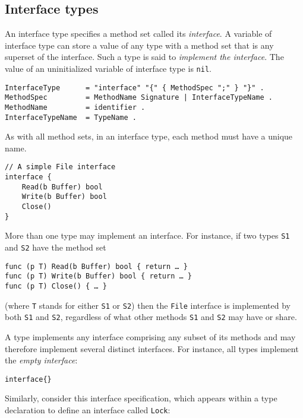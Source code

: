\subsection*{Interface types}

An interface type specifies a method set called
its \emph{interface}. A variable of interface type can store a value of
any type with a method set that is any superset of the interface. Such a
type is said to \emph{implement the interface}. The value of an
uninitialized variable of interface type is \texttt{nil}.

\begin{Verbatim}[frame=single]
InterfaceType      = "interface" "{" { MethodSpec ";" } "}" .
MethodSpec         = MethodName Signature | InterfaceTypeName .
MethodName         = identifier .
InterfaceTypeName  = TypeName .
\end{Verbatim}

As with all method sets, in an interface type, each method must have a
unique name.

\begin{Verbatim}[frame=single]
// A simple File interface
interface {
    Read(b Buffer) bool
    Write(b Buffer) bool
    Close()
}
\end{Verbatim}

More than one type may implement an interface. For instance, if two
types \texttt{S1} and \texttt{S2} have the method set

\begin{Verbatim}[frame=single]
func (p T) Read(b Buffer) bool { return … }
func (p T) Write(b Buffer) bool { return … }
func (p T) Close() { … }
\end{Verbatim}

(where \texttt{T} stands for either \texttt{S1} or \texttt{S2}) then the
\texttt{File} interface is implemented by both \texttt{S1} and
\texttt{S2}, regardless of what other methods \texttt{S1} and
\texttt{S2} may have or share.

A type implements any interface comprising any subset of its methods and
may therefore implement several distinct interfaces. For instance, all
types implement the \emph{empty interface}:

\begin{Verbatim}[frame=single]
interface{}
\end{Verbatim}

Similarly, consider this interface specification, which appears within a
type declaration to define an interface
called \texttt{Lock}:

